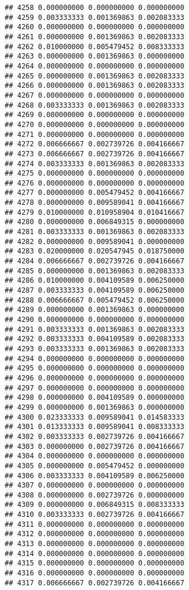 \documentclass[
]{article}
\begin{document}
\begin{verbatim}
## 4258 0.000000000 0.000000000 0.000000000
## 4259 0.003333333 0.001369863 0.002083333
## 4260 0.000000000 0.000000000 0.000000000
## 4261 0.000000000 0.001369863 0.002083333
## 4262 0.010000000 0.005479452 0.008333333
## 4263 0.000000000 0.001369863 0.000000000
## 4264 0.000000000 0.000000000 0.000000000
## 4265 0.000000000 0.001369863 0.002083333
## 4266 0.000000000 0.001369863 0.002083333
## 4267 0.000000000 0.000000000 0.000000000
## 4268 0.003333333 0.001369863 0.002083333
## 4269 0.000000000 0.000000000 0.000000000
## 4270 0.000000000 0.000000000 0.000000000
## 4271 0.000000000 0.000000000 0.000000000
## 4272 0.006666667 0.002739726 0.004166667
## 4273 0.006666667 0.002739726 0.004166667
## 4274 0.003333333 0.001369863 0.002083333
## 4275 0.000000000 0.000000000 0.000000000
## 4276 0.000000000 0.000000000 0.000000000
## 4277 0.000000000 0.005479452 0.004166667
## 4278 0.000000000 0.009589041 0.004166667
## 4279 0.010000000 0.010958904 0.010416667
## 4280 0.000000000 0.006849315 0.000000000
## 4281 0.003333333 0.001369863 0.002083333
## 4282 0.000000000 0.009589041 0.000000000
## 4283 0.020000000 0.020547945 0.018750000
## 4284 0.006666667 0.002739726 0.004166667
## 4285 0.000000000 0.001369863 0.002083333
## 4286 0.010000000 0.004109589 0.006250000
## 4287 0.003333333 0.004109589 0.006250000
## 4288 0.006666667 0.005479452 0.006250000
## 4289 0.000000000 0.001369863 0.000000000
## 4290 0.000000000 0.000000000 0.000000000
## 4291 0.003333333 0.001369863 0.002083333
## 4292 0.003333333 0.004109589 0.002083333
## 4293 0.003333333 0.001369863 0.002083333
## 4294 0.000000000 0.000000000 0.000000000
## 4295 0.000000000 0.000000000 0.000000000
## 4296 0.000000000 0.000000000 0.000000000
## 4297 0.000000000 0.000000000 0.000000000
## 4298 0.000000000 0.004109589 0.000000000
## 4299 0.000000000 0.001369863 0.000000000
## 4300 0.023333333 0.009589041 0.014583333
## 4301 0.013333333 0.009589041 0.008333333
## 4302 0.003333333 0.002739726 0.004166667
## 4303 0.000000000 0.002739726 0.004166667
## 4304 0.000000000 0.000000000 0.000000000
## 4305 0.000000000 0.005479452 0.000000000
## 4306 0.003333333 0.004109589 0.006250000
## 4307 0.000000000 0.000000000 0.000000000
## 4308 0.000000000 0.002739726 0.000000000
## 4309 0.000000000 0.006849315 0.008333333
## 4310 0.003333333 0.002739726 0.004166667
## 4311 0.000000000 0.000000000 0.000000000
## 4312 0.000000000 0.000000000 0.000000000
## 4313 0.000000000 0.000000000 0.000000000
## 4314 0.000000000 0.000000000 0.000000000
## 4315 0.000000000 0.000000000 0.000000000
## 4316 0.000000000 0.000000000 0.000000000
## 4317 0.006666667 0.002739726 0.004166667

\end{verbatim}
\end{document}
